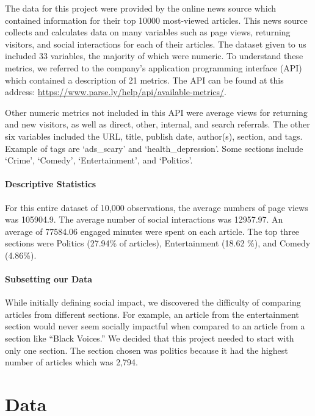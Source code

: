 \documentclass[10pt,letterpaper]{article}
\begin{document}
The data for this project were provided by the online news source which
contained information for their top 10000 most-viewed articles. This
news source collects and calculates data on many variables such as page
views, returning visitors, and social interactions for each of their
articles. The dataset given to us included 33 variables, the majority of
which were numeric. To understand these metrics, we referred to the
company's application programming interface (API) which contained a
description of 21 metrics. The API can be found at this address:
\url{https://www.parse.ly/help/api/available-metrics/}.

Other numeric metrics not included in this API were average views for
returning and new visitors, as well as direct, other, internal, and
search referrals. The other six variables included the URL, title,
publish date, author(s), section, and tags. Example of tags are
`ads\_scary' and `health\_depression'. Some sections include `Crime',
`Comedy', `Entertainment', and `Politics'.

\hypertarget{descriptive-statistics}{%
\paragraph{Descriptive Statistics}\label{descriptive-statistics}}

For this entire dataset of 10,000 observations, the average numbers of
page views was 105904.9. The average number of social interactions was
12957.97. An average of 77584.06 engaged minutes were spent on each
article. The top three sections were Politics (27.94\% of articles),
Entertainment (18.62 \%), and Comedy (4.86\%).

\hypertarget{subsetting-our-data}{%
\paragraph{Subsetting our Data}\label{subsetting-our-data}}

While initially defining social impact, we discovered the difficulty of
comparing articles from different sections. For example, an article from
the entertainment section would never seem socially impactful when
compared to an article from a section like ``Black Voices.'' We decided
that this project needed to start with only one section. The section
chosen was politics because it had the highest number of articles which
was 2,794.

\hypertarget{data}{%
\section{Data}\label{data}}
\end{document}
